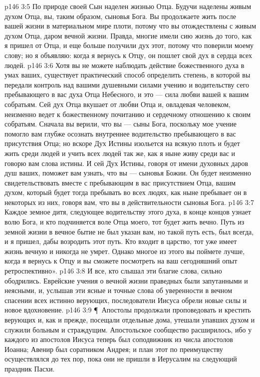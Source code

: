 \vs p146 3:5 По природе своей Сын наделен жизнью Отца. Будучи наделены живым духом Отца, вы, таким образом, сыновья Бога. Вы продолжаете жить после вашей жизни в материальном мире плоти, потому что вы отождествлены с живым духом Отца, даром вечной жизни. Правда, многие имели сию жизнь до того, как я пришел от Отца, и еще больше получили дух этот, потому что поверили моему слову; но я объявляю: когда я вернусь к Отцу, он пошлет свой дух в сердца всех людей.
\vs p146 3:6 Хотя вы не можете наблюдать действие божественного духа в умах ваших, существует практический способ определить степень, в которой вы передали контроль над вашими душевными силами учению и водительству сего пребывающего в вас духа Отца Небесного, и это --- сила любви вашей к вашим собратьям. Сей дух Отца вкушает от любви Отца и, овладевая человеком, неизменно ведет к божественному почитанию и сердечному отношению к своим собратьям. Сначала вы верили, что вы --- сыны Бога, поскольку мое учение помогло вам глубже осознать внутреннее водительство пребывающего в вас присутствия Отца; но вскоре Дух Истины изольется на всякую плоть и будет жить среди людей и учить всех людей так же, как я ныне живу среди вас и говорю вам слова истины. И сей Дух Истины, говоря от имени духовных даров душ ваших, поможет вам узнать, что вы --- сыновья Божии. Он будет неизменно свидетельствовать вместе с пребывающим в вас присутствием Отца, вашим духом, который будет тогда пребывать во всех людях, как ныне пребывает он в некоторых из них, говоря вам, что вы в действительности сыновья Бога.
\vs p146 3:7 Каждое земное дитя, следующее водительству этого духа, в конце концов узнает волю Бога, и кто подчиняется воле Отца моего, тот будет жить вечно. Путь из земной жизни в вечное бытие не был указан вам, но такой путь есть, был всегда, и я пришел, дабы возродить этот путь. Кто входит в царство, тот уже имеет жизнь вечную и никогда не умрет. Однако многое из этого вы поймете лучше, когда я вернусь к Отцу и вы сможете посмотреть на ваш сегодняшний опыт ретроспективно».
\vs p146 3:8 И все, кто слышал эти благие слова, сильно ободрились. Еврейские учения о вечной жизни праведных были запутанными и неясными, и, услышав эти ясные и точные слова об уверенности в вечном спасении всех истинно верующих, последователи Иисуса обрели новые силы и новое вдохновение.
\vs p146 3:9 \P\ Апостолы продолжали проповедовать и крестить верующих и, как и прежде, посещали отдельные дома, утешали упавших духом и служили больным и страждущим. Апостольское сообщество расширилось, ибо у каждого из апостолов Иисуса теперь был соподвижник из числа апостолов Иоанна; Авенир был соратником Андрея; и план этот по преимуществу осуществлялся до тех пор, пока они не пришли в Иерусалим на следующий праздник Пасхи.
